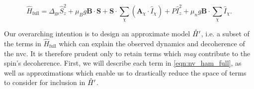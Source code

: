 \begin{equation}
    \label{eqn:nv_ham_full}
    \hat{H}_{\mathrm{\textrm{full}}} 
    = 
    \Delta_{\textrm{gs}} \hat{S}_z^2 
    + \mu_B g \mathbf{B} \cdot \mathbf{S} 
    + \mathbf{S} \cdot \sum_{\chi} \left( \mathbf{A}_{\chi} \cdot \hat{I}_{\chi} \right) 
    + P \hat{I}_z^2 
    + \mu_n g \mathbf{B} \cdot \sum_{ \chi} \hat{I}_{\chi}.
\end{equation}

Our overarching intention is to design an approximate model $\hat{H}^{\prime}$, 
    i.e. a subset of the terms in $\hat{H}_{\textrm{full}}$ which can explain the observed dynamics 
    and decoherence of the \gls{nvc}. 
It is therefore prudent only to retain terms which \emph{may} contribute to the spin's decoherence. 
First, we will describe each term in \cref{eqn:nv_ham_full}, 
    as well as approximations which enable us to drastically reduce the space of terms to consider for inclusion in $\hat{H}^{\prime}$. 

